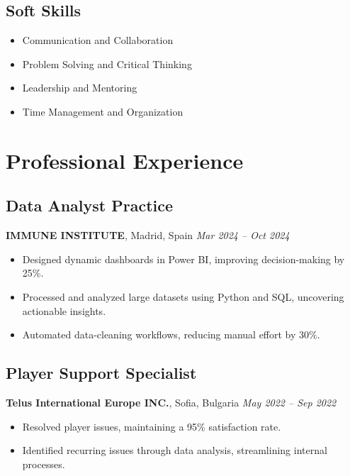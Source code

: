 \documentclass[11pt,a4paper]{article}
\begin{document}
\subsection*{Soft Skills}
\begin{itemize}[label=\textbullet, leftmargin=0.5cm]
    \item Communication and Collaboration
    \item Problem Solving and Critical Thinking
    \item Leadership and Mentoring
    \item Time Management and Organization
\end{itemize}

\vspace{1em}

\section*{Professional Experience}

\subsection*{Data Analyst Practice}
\textbf{IMMUNE INSTITUTE}, Madrid, Spain \hfill \textit{Mar 2024 – Oct 2024}  
\begin{itemize}[label=\textbullet, leftmargin=0.5cm]
    \item Designed dynamic dashboards in Power BI, improving decision-making by 25\%.
    \item Processed and analyzed large datasets using Python and SQL, uncovering actionable insights.
    \item Automated data-cleaning workflows, reducing manual effort by 30\%.
\end{itemize}

\subsection*{Player Support Specialist}
\textbf{Telus International Europe INC.}, Sofia, Bulgaria \hfill \textit{May 2022 – Sep 2022}  
\begin{itemize}[label=\textbullet, leftmargin=0.5cm]
    \item Resolved player issues, maintaining a 95\% satisfaction rate.
    \item Identified recurring issues through data analysis, streamlining internal processes.
\end{itemize}
\end{document}
